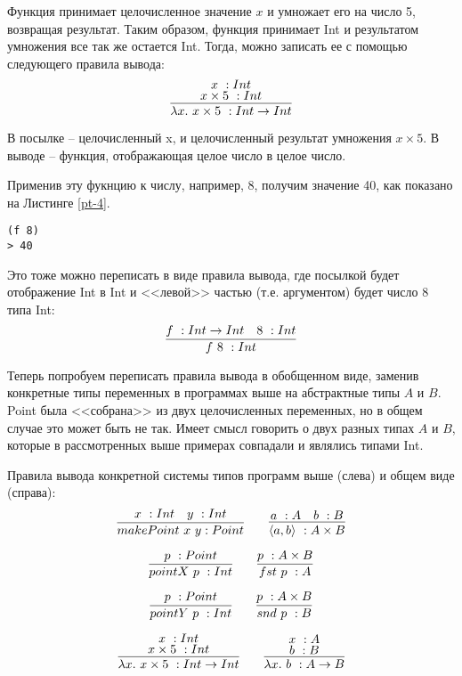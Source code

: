 \documentclass[a4paper,14pt]{extreport} %
\begin{document}
Функция принимает целочисленное значение $x$ и умножает его на число 5, возвращая результат. Таким образом, функция принимает Int и результатом умножения все так же остается Int. Тогда, можно записать ее с помощью следующего правила вывода:
$$
\infer{\lambda x . \ x \times 5 \ :Int \rightarrow Int}{%
    \deduce{x \times 5 \ :Int}{x \ :Int}
}
$$

В посылке -- целочисленный x, и целочисленный результат умножения $x \times 5$. В выводе -- функция, отображающая целое число в целое число.

Применив эту фукнцию к числу, например, 8, получим значение 40, как показано на Листинге \ref{pt-4}.
\begin{lstlisting}[caption={Применение функции}, label={pt-4}]
(f 8)
> 40
\end{lstlisting}

Это тоже можно переписать в виде правила вывода, где посылкой будет отображение Int в Int и <<левой>> частью (т.е. аргументом) будет число 8 типа Int:
$$
\infer{f \ 8 \ :Int}{%
    f \ :Int \rightarrow Int & 8 \ :Int
}
$$

Теперь попробуем переписать правила вывода в обобщенном виде, заменив конкретные типы переменных в  программах выше на абстрактные типы $A$ и $B$. Point была <<собрана>> из двух целочисленных переменных, но в общем случае это может быть не так. Имеет смысл говорить о двух разных типах $A$ и $B$, которые в рассмотренных выше примерах совпадали и являлись типами Int.

Правила вывода конкретной системы типов программ выше (слева) и общем виде (справа):
\begin{equation*}
\infer{makePoint \ x \ y :Point}{%
    x \ :Int & y \ :Int
}
\qquad
\infer{\langle a, b \rangle \ :A \times B}{%
    a \ :A & b \ :B
}
\end{equation*}

\begin{equation*}
\infer{pointX \ p \ :Int}{%
    p \ :Point
}
\qquad
\infer{fst \ p \ :A}{%
    p \ :A \times B
}
\end{equation*}

\begin{equation*}
\infer{pointY \ p \ :Int}{%
    p \ :Point
}
\qquad
\infer{snd \ p \ :B}{%
    p \ :A \times B
}
\end{equation*}

\begin{equation*}
\infer{\lambda x . \ x \times 5 \ :Int \rightarrow Int}{%
    \deduce{x \times 5 \ :Int}{x \ :Int}
}
\qquad
\infer{\lambda x . \ b \ :A \rightarrow B}{%
    \deduce{b \ :B}{x \ :A}
}
\end{equation*}
\end{document}
